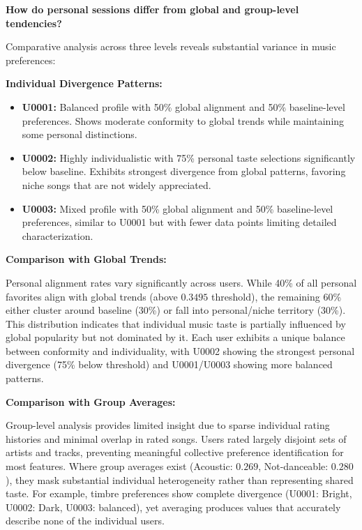 \documentclass[12pt,a4paper]{article}
\begin{document}
\textbf{How do personal sessions differ from global and group-level tendencies?}

Comparative analysis across three levels reveals substantial variance in music preferences:

\textbf{Individual Divergence Patterns:}
\begin{itemize}
    \item \textbf{U0001:} Balanced profile with 50\% global alignment and 50\% baseline-level preferences. Shows moderate conformity to global trends while maintaining some personal distinctions.
    
    \item \textbf{U0002:} Highly individualistic with 75\% personal taste selections significantly below baseline. Exhibits strongest divergence from global patterns, favoring niche songs that are not widely appreciated.
    
    \item \textbf{U0003:} Mixed profile with 50\% global alignment and 50\% baseline-level preferences, similar to U0001 but with fewer data points limiting detailed characterization.
\end{itemize}

\textbf{Comparison with Global Trends:}

Personal alignment rates vary significantly across users. While 40\% of all personal favorites align with global trends (above $0.3495$ threshold), the remaining 60\% either cluster around baseline (30\%) or fall into personal/niche territory (30\%). This distribution indicates that individual music taste is partially influenced by global popularity but not dominated by it. Each user exhibits a unique balance between conformity and individuality, with U0002 showing the strongest personal divergence (75\% below threshold) and U0001/U0003 showing more balanced patterns.

\textbf{Comparison with Group Averages:}

Group-level analysis provides limited insight due to sparse individual rating histories and minimal overlap in rated songs. Users rated largely disjoint sets of artists and tracks, preventing meaningful collective preference identification for most features. Where group averages exist (Acoustic: $0.269$, Not-danceable: $0.280$), they mask substantial individual heterogeneity rather than representing shared taste. For example, timbre preferences show complete divergence (U0001: Bright, U0002: Dark, U0003: balanced), yet averaging produces values that accurately describe none of the individual users.
\end{document}
